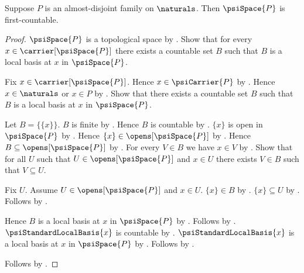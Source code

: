\begin{theorem}\label{psi_space_is_first_countable}
    Suppose $P$ is an almost-disjoint family on $\naturals$.
    Then $\psiSpace{P}$ is first-countable.
\end{theorem}
\begin{proof}
    $\psiSpace{P}$ is a topological space
        by .
    Show that for every $x\in\carrier[\psiSpace{P}]$ there exists
        a countable set $B$ such that
            $B$ is a local basis at $x$ in $\psiSpace{P}$.
    \begin{subproof}
        Fix $x\in\carrier[\psiSpace{P}]$.
        Hence $x\in\psiCarrier{P}$ by .
        Hence $x\in\naturals$ or $x\in P$
            by .
        Show that there exists a countable set $B$ such that
            $B$ is a local basis at $x$ in $\psiSpace{P}$.
        \begin{subproof}
            \begin{byCase}
                    Let $B=\{\{x\}\}$.
                    $B$ is finite by .
                    Hence $B$ is countable by .
                    $\{x\}$ is open in $\psiSpace{P}$ by
                        .
                    Hence $\{x\}\in\opens[\psiSpace{P}]$
                        by .
                    Hence $B\subseteq\opens[\psiSpace{P}]$
                        by .
                    For every $V\in B$ we have $x\in V$
                        by .
                    Show that for all $U$ such that
                        $U\in\opens[\psiSpace{P}]$ and $x\in U$
                        there exists $V\in B$ such that $V\subseteq U$.
                    \begin{subproof}
                        Fix $U$.
                        Assume $U\in\opens[\psiSpace{P}]$ and $x\in U$.
                        $\{x\}\in B$ by .
                        $\{x\}\subseteq U$ by
                            .
                        Follows by \auto.
                    \end{subproof}
                    Hence $B$ is a local basis at $x$ in
                        $\psiSpace{P}$ by .
                    Follows by \auto.
                    $\psiStandardLocalBasis{x}$ is countable by
                        .
                    $\psiStandardLocalBasis{x}$ is a local basis at $x$
                        in $\psiSpace{P}$ by
                        .
                    Follows by \auto.
            \end{byCase}
        \end{subproof}
    \end{subproof}
    Follows by .
\end{proof}

